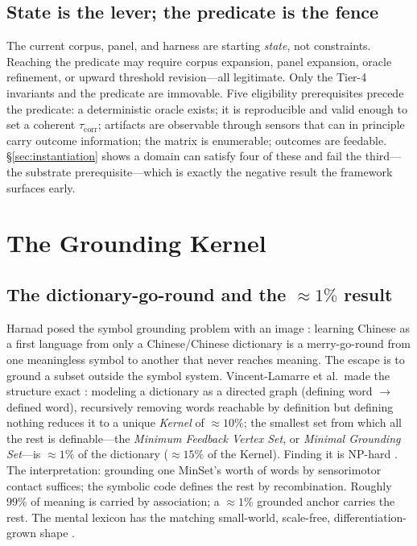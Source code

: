 \documentclass[10pt,twocolumn]{article}
\begin{document}
\subsection{State is the lever; the predicate is the fence}
The current corpus, panel, and harness are starting \emph{state}, not
constraints. Reaching the predicate may require corpus expansion, panel
expansion, oracle refinement, or upward threshold revision---all legitimate. Only
the Tier-4 invariants and the predicate are immovable. Five eligibility
prerequisites precede the predicate: a deterministic oracle exists; it is
reproducible and valid enough to set a coherent $\tau_{\mathrm{corr}}$; artifacts
are observable through sensors that can in principle carry outcome information; the
matrix is enumerable; outcomes are feedable. \S\ref{sec:instantiation} shows a
domain can satisfy four of these and fail the third---the substrate
prerequisite---which is exactly the negative result the framework surfaces early.

\section{The Grounding Kernel}
\label{sec:kernel}

\subsection{The dictionary-go-round and the $\approx1\%$ result}
Harnad posed the symbol grounding problem with an image
\citep{harnad1990symbol}: learning Chinese as a first language from only a
Chinese/Chinese dictionary is a merry-go-round from one meaningless symbol to
another that never reaches meaning. The escape is to ground a subset outside the
symbol system. Vincent-Lamarre et al.\ made the structure exact
\citep{vincentlamarre2016latent}: modeling a dictionary as a directed graph
(defining word $\to$ defined word), recursively removing words reachable by
definition but defining nothing reduces it to a unique \emph{Kernel} of
$\approx10\%$; the smallest set from which all the rest is definable---the
\emph{Minimum Feedback Vertex Set}, or \emph{Minimal Grounding Set}---is
$\approx1\%$ of the dictionary ($\approx15\%$ of the Kernel). Finding it is
NP-hard \citep{karp1972reducibility}. The interpretation: grounding one MinSet's
worth of words by sensorimotor contact suffices; the symbolic code defines the
rest by recombination. Roughly $99\%$ of meaning is carried by association; a
$\approx1\%$ grounded anchor carries the rest. The mental lexicon has the matching
small-world, scale-free, differentiation-grown shape \citep{steyvers2005largescale}.
\end{document}
